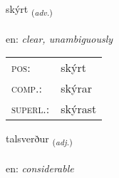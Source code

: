 \documentclass[frontgrid, backgrid]{flacards}\usepackage[]{graphicx}\usepackage[]{color}
\begin{document}
\renewcommand{\flhead}{\vskip5pt \fboxsep=0pt {\small\bfseries\footnotesize Atviksorð | Adverb}}
\renewcommand{\fcfoot}{\vskip5pt \fboxsep=0pt \hspace{2pt}{\small\bfseries\footnotesize 2K}}

\renewcommand{\blhead}{\vskip5pt {\small\bfseries\footnotesize Atviksorð | Adverb }}
\renewcommand{\bcfoot}{\vskip5pt \hspace{2pt}{\small\bfseries\footnotesize 2K}}


{skýrt \small{\textsubscript{(\textit{adv.})}} \\[1ex] %
\textphonetic{[scir̥t]} \\
en: \emph{clear, unambiguously} \\  [2ex]
\renewcommand*{\arraystretch}{0.8}
\begin{tabular}{ll}
\textsc{pos}: & skýrt \\ 
\textsc{comp.}: & skýrar \\ 
\textsc{superl.}: & skýrast \\
\end{tabular}
}

\renewcommand{\flhead}{\vskip5pt \fboxsep=0pt {\small\bfseries\footnotesize Lýsingarorð | Adjective}}
\renewcommand{\fcfoot}{\vskip5pt \fboxsep=0pt \hspace{2pt}{\small\bfseries\footnotesize 2K}}

\renewcommand{\blhead}{\vskip5pt {\small\bfseries\footnotesize Lýsingarorð | Adjective }}
\renewcommand{\bcfoot}{\vskip5pt \hspace{2pt}{\small\bfseries\footnotesize 2K}}


{talsverður \small{\textsubscript{(\textit{adj.})}} \\[1ex] %
\textphonetic{[tʰalsvɛrðʏr]} \\
en: \emph{considerable} \\  [2ex]
\renewcommand*{\arraystretch}{0.8}
}
\end{document}
